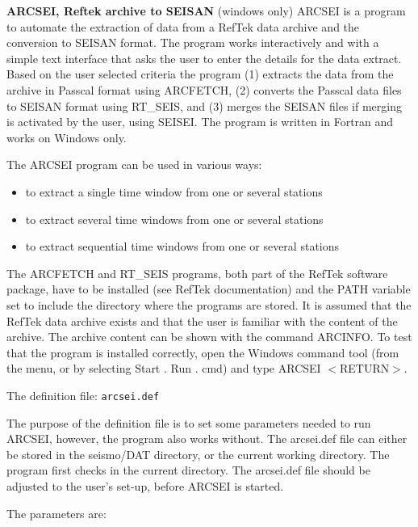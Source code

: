 \textbf{ARCSEI, Reftek archive to SEISAN} (windows only) \newline 
{}
ARCSEI is a program to automate the extraction of data from a RefTek data archive and the conversion to SEISAN format. The program works interactively and with a simple text interface that asks the user to enter the details for the data extract. Based on the user selected criteria the program (1) extracts the data from the archive in Passcal format using ARCFETCH, (2) converts the Passcal data files to SEISAN format using RT\_SEIS, and (3) merges the SEISAN files if merging is activated by the user, using SEISEI. The program is written in Fortran and works on Windows only. 

The ARCSEI program can be used in various ways: 

\begin{itemize}
\item
to extract a single time window from one or several stations 
\item
to extract several time windows from one or several stations 
\item
to extract sequential time windows from one or several stations 
\end{itemize}

The ARCFETCH and RT\_SEIS programs, both part of the RefTek software package, have to be installed (see RefTek documentation) and the PATH variable set to include the directory where the programs are stored. It is assumed that the RefTek data archive exists and that the user is familiar with the content of the archive. The archive content can be shown with the command ARCINFO. To test that the program is installed correctly, open the Windows command tool (from the menu, or by selecting Start . Run . cmd) and type ARCSEI $<$RETURN$>$. 

The definition file: \texttt{arcsei.def}

The purpose of the definition file is to set some parameters needed to run ARCSEI, however, the program also works without. The arcsei.def file can either be stored in the seismo/DAT directory, or the current working directory. The program first checks in the current directory. The arcsei.def file should be adjusted to the user's set-up, before ARCSEI is started.  

The parameters are: 

